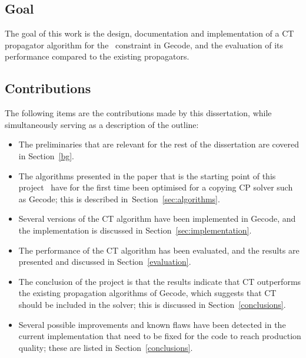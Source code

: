 \documentclass[a4paper,11pt]{article}
\theoremstyle{definition}
\newcommand{\Secref}[1]{Section~\ref{#1}}
\newcommand{\Table}{\Constraint{Table}}
\numberwithin{equation}{section}
\begin{document}
\subsection{Goal}
\label{intro:goal}
The goal of this work is the design, documentation and implementation
of a CT propagator algorithm for the \Table~constraint in Gecode,
and the evaluation of its performance compared to the existing propagators.

\subsection{Contributions}
\label{intro:contributions}

The following items are the contributions made by this dissertation,
while simultaneously serving as a description of the outline:

\begin{itemize}
  \item The preliminaries that are relevant for the rest of the dissertation
    are covered in \Secref{bg}.

  \item The algorithms presented in the paper that is the starting point of this
    project~\cite{DBLP:conf/cp/DemeulenaereHLP16}
    have for the first time been optimised for a copying CP solver such as Gecode;
    this is described in~\Secref{sec:algorithms}.

  \item Several versions of the CT algorithm have been implemented in Gecode, and
    the implementation is discussed in \Secref{sec:implementation}.

  \item The performance of the CT algorithm has been evaluated,
    and the results
    are presented and discussed in \Secref{evaluation}.

  \item The conclusion of the project is that the results indicate
    that CT outperforms the existing propagation algorithms of Gecode, which
    suggests that CT should be included in the solver; this is discussed
    in \Secref{conclusions}.

  \item Several possible improvements and known flaws have been detected in the current
    implementation that need to be fixed for the code to reach production
    quality; these are listed in \Secref{conclusions}.

\end{itemize}
\end{document}
